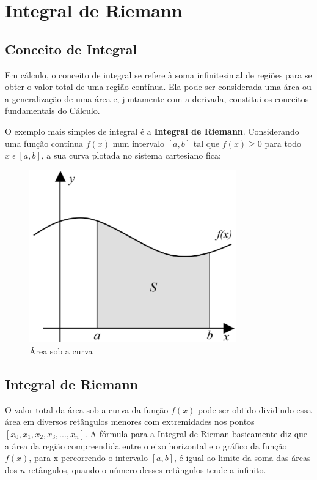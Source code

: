 \section{Integral de Riemann}

\subsection{Conceito de Integral}

Em cálculo, o conceito de integral se refere à soma infinitesimal de regiões para se obter o valor total de uma região contínua. Ela pode ser considerada uma área ou a generalização de uma área e, juntamente com a derivada, constitui os conceitos fundamentais do Cálculo.

O exemplo mais simples de integral é a \textbf{Integral de Riemann}. Considerando uma função contínua $f(x)$ num intervalo $[a,b]$ tal que $f(x) \geq 0$  para todo $x \; \epsilon \; [a,b]$, a sua curva plotada no sistema cartesiano fica:

\begin{figure}[H]
	\centering
	\includegraphics[width=0.8\textwidth]{./Imagens/Integral de Riemann/RI1.png} 
	\caption{Área sob a curva}
	\label{fig:RI1}
\end{figure}

\subsection{Integral de Riemann}

O valor total da área sob a curva da função $f(x)$ pode ser obtido dividindo essa área em diversos retângulos menores com extremidades nos pontos $[x_{0}, x_{1}, x_{2}, x_{3}, ..., x_{n}]$. A fórmula para a Integral de Rieman basicamente diz que a área da região compreendida entre o eixo horizontal e o gráfico da função $f(x)$, para x percorrendo o intervalo $[a,b]$, é igual ao limite da soma das áreas dos $n$ retângulos, quando o número desses retângulos tende a infinito.

